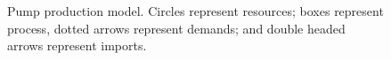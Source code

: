 \begin{figure}[h!]
	\centering
	
	\caption{Pump production model. Circles represent resources; boxes represent process, dotted arrows represent demands; and double headed arrows represent imports.} \label{fig:pump}
\end{figure}
% 
% 

